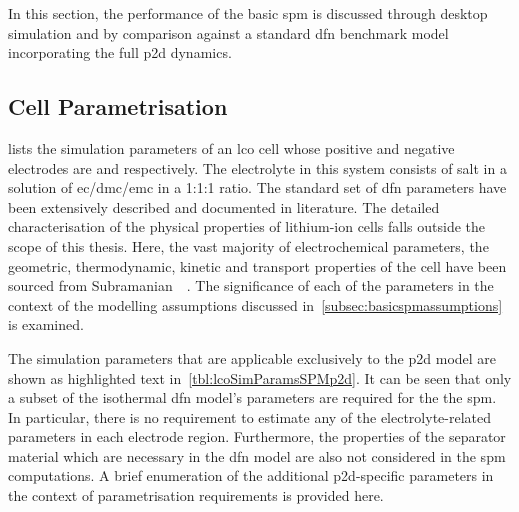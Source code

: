 
In this  section, the performance  of the  basic \gls{spm} is  discussed through
desktop  simulation and  by comparison  against a  standard \gls{dfn}  benchmark
model incorporating the full \gls{p2d} dynamics.

\subsection{Cell Parametrisation}\label{subsec:spmp2dparametrisation}


 lists  the simulation  parameters of  an \gls{lco}
cell  whose positive  and negative  electrodes are   and  
respectively.  The  electrolyte in  this  system  consists of    salt
in  a   solution  of   \gls{ec}/\gls{dmc}/\gls{emc}  in   a  1:1:1   ratio.  The
standard  set  of  \gls{dfn}  parameters have  been  extensively  described  and
documented  in  literature.  The   detailed  characterisation  of  the  physical
properties  of  lithium-ion  cells  falls  outside the  scope  of  this  thesis.
Here, the  vast majority  of electrochemical  parameters, \viz{}  the geometric,
thermodynamic, kinetic  and transport properties  of the cell have  been sourced
from  Subramanian~\etal{}~\cite{Subramanian2009}.   The  significance   of  each
of  the  parameters  in  the  context of  the  modelling  assumptions  discussed
in~\cref{subsec:basicspmassumptions} is examined.


The simulation parameters that are applicable exclusively to the \gls{p2d} model
are shown as  highlighted text in~\cref{tbl:lcoSimParamsSPMp2d}. It  can be seen
that only a  subset of the isothermal \gls{dfn} model's  parameters are required
for the the \gls{spm}. In particular, there is no requirement to estimate any of
the electrolyte-related  parameters in  each electrode region.  Furthermore, the
properties of the separator material which  are necessary in the \gls{dfn} model
are also  not considered in the  \gls{spm} computations. A brief  enumeration of
the additional  \gls{p2d}-specific parameters in the  context of parametrisation
requirements is provided here.

